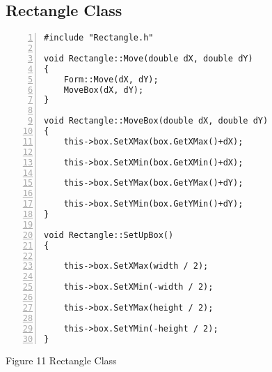 \documentclass{llncs}
\begin{document}
\subsection{Rectangle Class}
\begin{lstlisting}[basicstyle=\footnotesize\ttfamily, numbers=left, stepnumber=1, numberstyle = \normalsize]
#include "Rectangle.h"

void Rectangle::Move(double dX, double dY)
{
	Form::Move(dX, dY);
	MoveBox(dX, dY);
}

void Rectangle::MoveBox(double dX, double dY)
{
	this->box.SetXMax(box.GetXMax()+dX);

	this->box.SetXMin(box.GetXMin()+dX);

	this->box.SetYMax(box.GetYMax()+dY);

	this->box.SetYMin(box.GetYMin()+dY);
}

void Rectangle::SetUpBox()
{

	this->box.SetXMax(width / 2);

	this->box.SetXMin(-width / 2);

	this->box.SetYMax(height / 2);

	this->box.SetYMin(-height / 2);
}
\end{lstlisting}
\footnotesize{Figure 11 Rectangle Class}
\end{document}
